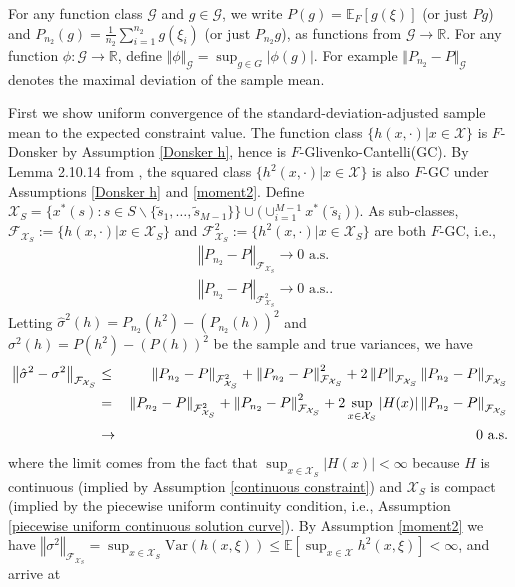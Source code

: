 \documentclass[mnsc,blindrev]{informs4} %
\newcommand{\R}{\mathbb{R}}
\newcommand{\norm}[1]{\left \Vert #1 \right\Vert}
\newcommand{\abs}[1]{\left \vert #1 \right\vert}
\begin{document}
For any function class $\mathcal G$ and $g\in\mathcal G$, we write $P(g)=\mathbb E_F[g(\xi)]$ (or just $Pg$) and $P_{n_2}(g) = \frac{1}{n_2}\sum_{i=1}^{n_2}g(\xi_i)$ (or just $P_{n_2}g$), as functions from $\mathcal G\to \R$. For any function $\phi:\mathcal G\to \R$, define $\Vert \phi \Vert_{\mathcal G}=\sup_{g\in G}\lvert \phi(g)\rvert$. For example $\Vert P_{n_2}-P \Vert_{\mathcal G}$ denotes the maximal deviation of the sample mean.

First we show uniform convergence of the standard-deviation-adjusted sample mean to the expected constraint value. The function class $\{h(x,\cdot)\vert x\in\mathcal X\}$ is $F$-Donsker by Assumption \ref{Donsker h}, hence is $F$-Glivenko-Cantelli(GC). By Lemma 2.10.14 from \cite{van1996weak}, the squared class $\{h^2(x,\cdot)\vert x\in\mathcal X\}$ is also $F$-GC under Assumptions \ref{Donsker h} and \ref{moment2}. Define $\mathcal X_S=\{x^*(s):s\in S\backslash\{\tilde s_1,\ldots,\tilde s_{M-1}\}\}\cup \big(\cup_{i=1}^{M-1}x^*(\tilde s_i)\big)$. As sub-classes, $\mathcal F_{\mathcal X_S}:=\{h(x,\cdot)\vert x\in\mathcal X_S\}$ and $\mathcal F_{\mathcal X_S}^2:=\{h^2(x,\cdot)\vert x\in\mathcal X_S\}$ are both $F$-GC, i.e.,
\begin{align*}
&\norm{P_{n_2}-P}_{\mathcal F_{\mathcal X_S}}\to 0\text{\ a.s.}\\
&\norm{P_{n_2}-P}_{\mathcal F_{\mathcal X_S}^2}\to 0\text{\ a.s..}
\end{align*}
Letting $\hat{\sigma}^2(h)=P_{n_2}(h^2)-(P_{n_2}(h))^2$ and $\sigma^2(h)=P(h^2)-(P(h))^2$ be the sample and true variances, we have
\begin{eqnarray}
\notag\norm{\hat{\sigma}^2-\sigma^2}_{\mathcal F_{\mathcal X_S}}&\leq &\norm{P_{n_2}-P}_{\mathcal F_{\mathcal X_S}^2}+\norm{P_{n_2}-P}_{\mathcal F_{\mathcal X_S}}^2+2\norm{P}_{\mathcal F_{\mathcal X_S}}\norm{P_{n_2}-P}_{\mathcal F_{\mathcal X_S}}\\
\notag&=&\norm{P_{n_2}-P}_{\mathcal F_{\mathcal X_S}^2}+\norm{P_{n_2}-P}_{\mathcal F_{\mathcal X_S}}^2+2\sup_{x\in\mathcal X_S}\abs{H(x)}\norm{P_{n_2}-P}_{\mathcal F_{\mathcal X_S}}\\
&\to& 0\text{\ a.s.}\label{uniform convergence sample variance}
\end{eqnarray}
where the limit comes from the fact that $\sup_{x\in\mathcal X_S}\abs{H(x)}<\infty$ because $H$ is continuous (implied by Assumption \ref{continuous constraint}) and $\mathcal X_S$ is compact (implied by the piecewise uniform continuity condition, i.e., Assumption \ref{piecewise uniform continuous solution curve}). By Assumption \ref{moment2} we have $\norm{\sigma^2}_{\mathcal F_{\mathcal X_S}}=\sup_{x\in\mathcal X_S}\mathrm{Var}(h(x,\xi))\leq \mathbb E[\sup_{x\in\mathcal X}h^2(x,\xi)]<\infty$, and arrive at
\end{document}
